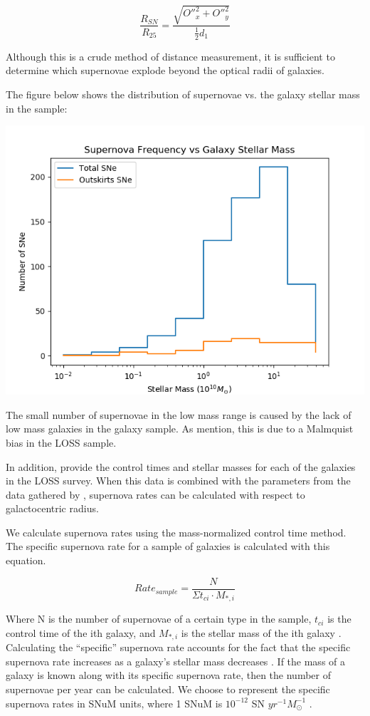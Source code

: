 \documentclass[apj]{emulateapj}
\begin{document}
\begin{equation}
\frac{R_{SN}}{R_{25}}=\frac{\sqrt{{O''}_x^2 + {O''}_y^2}}{\frac{1}{2} d_1}
\end{equation}

Although this is a crude method of distance measurement, it is sufficient to determine which supernovae explode beyond the optical radii of galaxies.

The figure below shows the distribution of supernovae vs. the galaxy stellar mass in the sample:

\includegraphics[scale=0.5]{supernova_freq_vs_stellar_mass}

The small number of supernovae in the low mass range is caused by the lack of low mass galaxies in the galaxy sample. As \citet{Leaman11} mention, this is due to a Malmquist bias in the LOSS sample.

In addition, \citet{Graur17} provide the control times and stellar masses for each of the galaxies in the LOSS survey. When this data is combined with the parameters from the data gathered by \citet{Leaman11}, supernova rates can be calculated with respect to galactocentric radius.

We calculate supernova rates using the mass-normalized control time method. The specific supernova rate for a sample of galaxies is calculated with this equation.

\begin{equation}
Rate_{sample}=\frac{N}{\Sigma t_{ci} \cdot M_{*, i}}
\end{equation}

Where N is the number of supernovae of a certain type in the sample, $t_{ci}$ is the control time of the ith galaxy, and $M_{*,i}$ is the stellar mass of the ith galaxy \citep{Graur17}. Calculating the “specific” supernova rate accounts for the fact that the specific supernova rate increases as a galaxy's stellar mass decreases \citep{Leaman11}. If the mass of a galaxy is known along with its specific supernova rate, then the number of supernovae per year can be calculated. We choose to represent the specific supernova rates in SNuM units, where 1 SNuM is $10^{-12}$ SN $yr^{-1} M_{\odot}^{-1}$ \citep{Graur17}.
\end{document}
